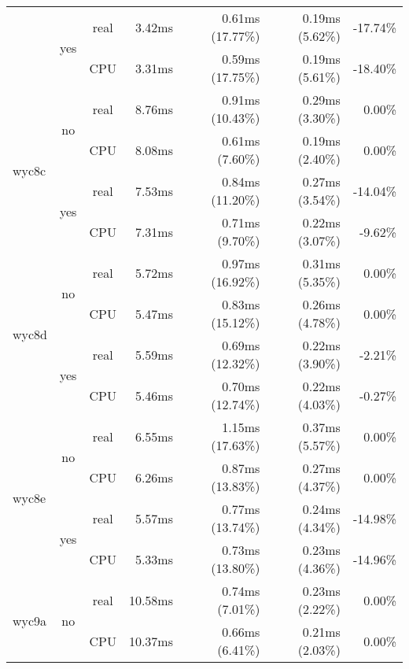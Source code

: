 \documentclass[en]{pracamgr}
\begin{document}
\begin{appendices}
\begin{small}
\begin{longtable}{|l|c|c|r|r|r|r|}
                          \cline{2-7}
                          & \multirow{2}{*}{yes} & real & 3.42ms & 0.61ms (17.77\%) & 0.19ms (5.62\%) & -17.74\% \\*
                          &                      & CPU  & 3.31ms & 0.59ms (17.75\%) & 0.19ms (5.61\%) & -18.40\% \\
\hline
\multirow{4}{*}{wyc8c}    & \multirow{2}{*}{no}  & real & 8.76ms & 0.91ms (10.43\%) & 0.29ms (3.30\%) & 0.00\% \\*
                          &                      & CPU  & 8.08ms & 0.61ms (7.60\%) & 0.19ms (2.40\%) & 0.00\% \\*
                          \cline{2-7}
                          & \multirow{2}{*}{yes} & real & 7.53ms & 0.84ms (11.20\%) & 0.27ms (3.54\%) & -14.04\% \\*
                          &                      & CPU  & 7.31ms & 0.71ms (9.70\%) & 0.22ms (3.07\%) & -9.62\% \\
\hline
\multirow{4}{*}{wyc8d}    & \multirow{2}{*}{no}  & real & 5.72ms & 0.97ms (16.92\%) & 0.31ms (5.35\%) & 0.00\% \\*
                          &                      & CPU  & 5.47ms & 0.83ms (15.12\%) & 0.26ms (4.78\%) & 0.00\% \\*
                          \cline{2-7}
                          & \multirow{2}{*}{yes} & real & 5.59ms & 0.69ms (12.32\%) & 0.22ms (3.90\%) & -2.21\% \\*
                          &                      & CPU  & 5.46ms & 0.70ms (12.74\%) & 0.22ms (4.03\%) & -0.27\% \\
\hline
\multirow{4}{*}{wyc8e}    & \multirow{2}{*}{no}  & real & 6.55ms & 1.15ms (17.63\%) & 0.37ms (5.57\%) & 0.00\% \\*
                          &                      & CPU  & 6.26ms & 0.87ms (13.83\%) & 0.27ms (4.37\%) & 0.00\% \\*
                          \cline{2-7}
                          & \multirow{2}{*}{yes} & real & 5.57ms & 0.77ms (13.74\%) & 0.24ms (4.34\%) & -14.98\% \\*
                          &                      & CPU  & 5.33ms & 0.73ms (13.80\%) & 0.23ms (4.36\%) & -14.96\% \\
\hline
\multirow{4}{*}{wyc9a}    & \multirow{2}{*}{no}  & real & 10.58ms & 0.74ms (7.01\%) & 0.23ms (2.22\%) & 0.00\% \\*
                          &                      & CPU  & 10.37ms & 0.66ms (6.41\%) & 0.21ms (2.03\%) & 0.00\% \\*

\end{longtable}
\end{small}
\end{appendices}
\end{document}

